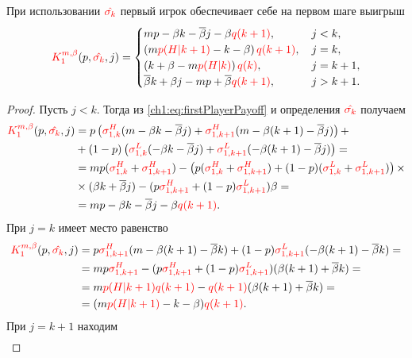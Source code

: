 {\begin{proposition}
  \label{ch1:prop:stage-payoff}
  При использовании $\textcolor{red}{\hat{\sigma_k}}$ первый игрок обеспечивает себе на первом шаге выигрыш
  \begin{equation}
    \label{ch1:eq:lowerPayoffGeneral}
    \K*{1}(p, \sigmak, j) =
    \begin{cases}
      mp - \Co k - \DCo j - \Co \qc{k+1},      & \, j < k,     \\
      \left(m \pac{H}{k+1} - k - \Co \right) \qc{k+1}, & \, j = k,     \\
      \left(k + \Co - m \pac{H}{k} \right) \qc{k},       & \, j = k + 1, \\
      \DCo k + \Co j - m p + \DCo \qc{k+1}, & \, j > k + 1.
    \end{cases}
  \end{equation}
\end{proposition}
\begin{proof}
  Пусть $j < k$.
  Тогда из \eqref{ch1:eq:firstPlayerPayoff} и определения $\textcolor{red}{\hat{\sigma_k}}$ получаем
  \begin{align*}
    \K*{1}(p, \sigmak, j) &=
    p \left( 
      \sigmasc[H]{k} (m - \Co k - \DCo j) +
      \sigmasc[H]{k+1} (m - \Co (k+1) - \DCo j)
    \right) + \\
    &+ (1-p) \left( 
      \sigmasc[L]{k} (- \Co k - \DCo j) +
      \sigmasc[L]{k+1} (- \Co (k+1) - \DCo j)
    \right) = \\
    &=
    m p (\sigmasc[H]{k} + \sigmasc[H]{k+1}) -
    \left(
      p (\sigmasc[H]{k} + \sigmasc[H]{k+1}) +
      (1-p) (\sigmasc[L]{k} + \sigmasc[L]{k+1})
    \right) \times \\ 
    &\times (\Co k + \DCo j) -
    (p \sigmasc[H]{k+1} + (1-p) \sigmasc[L]{k+1}) \Co = \\
    &= mp - \Co k - \DCo j - \Co \qc{k+1}.
  \end{align*}
  При $j = k$ имеет место равенство
  \begin{align*}
    \K*{1}(p, \sigmak, j) 
    &=
      p \sigmasc[H]{k+1} (m - \Co (k+1) - \DCo k) +
      (1-p) \sigmasc[L]{k+1} (- \Co (k+1) - \DCo k) = \\
    &= m p \sigmasc[H]{k+1} - 
      (p \sigmasc[H]{k+1} + (1-p) \sigmasc[L]{k+1}) (\Co (k+1) + \DCo k) =\\
    &= m \pac{H}{k+1} \qc{k+1} - \qc{k+1} (\Co (k+1) + \DCo k) = \\
    &= (m \pac{H}{k+1} - k - \Co) \qc{k+1}.
  \end{align*}
  При $j=k+1$ находим
  \begin{align*}

\end{align*}
\end{proof}}
